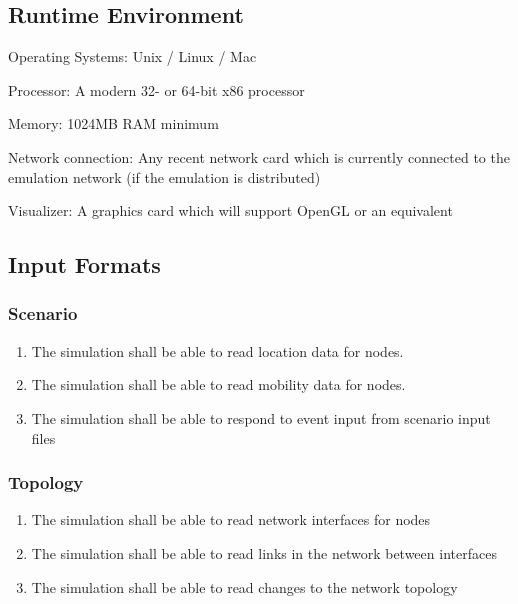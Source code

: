 \documentclass[titlepage]{article}
\begin{document}

\subsection{Runtime Environment} 
\begin{itemize*}
    \item Operating Systems:  Unix / Linux / Mac
    \item Processor:  A modern 32- or 64-bit x86 processor
    \item Memory:  1024MB RAM minimum
    \item Network connection:  Any recent network card which is currently connected to the emulation network (if the emulation is distributed)
    \item Visualizer:  A graphics card which will support OpenGL or an equivalent
\end{itemize*}


\subsection{Input Formats%
  \label{input-formats}%
}

\subsubsection{Scenario}
\begin{enumerate}
        \item The simulation shall be able to read location data for nodes.
		\item The simulation shall be able to read mobility data for nodes.
		\item The simulation shall be able to respond to event input from scenario input files
\end{enumerate}

\subsubsection{Topology}
\begin{enumerate}
    \item The simulation shall be able to read network interfaces for nodes
    \item The simulation shall be able to read links in the network between interfaces
    \item The simulation shall be able to read changes to the network topology
\end{enumerate}
\end{document}
